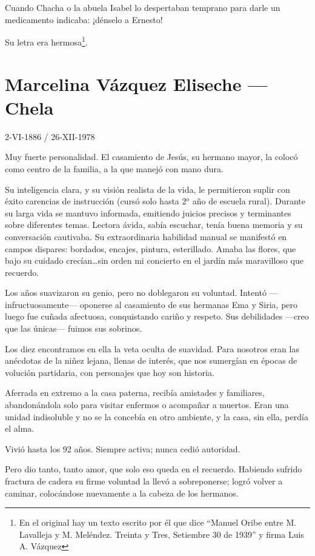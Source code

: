\documentclass[a4paper]{article}
\begin{document}
Cuando Chacha o la abuela Isabel lo despertaban temprano para darle un medicamento indicaba: ¡dénselo a Ernesto!

Su letra era hermosa\footnote{En el original hay un texto escrito por él que dice ``Manuel Oribe entre M. Lavalleja y M. Meléndez. Treinta y Tres, Setiembre 30 de 1939'' y firma Luis A. Vázquez}.

\section{Marcelina Vázquez Eliseche --- Chela}

2-VI-1886 / 26-XII-1978

\bigbreak{}

Muy fuerte personalidad. El casamiento de Jesús, su hermano mayor, la colocó como centro de la familia, a la que manejó con mano dura.

Su inteligencia clara, y su visión realista de la vida, le permitieron suplir con éxito carencias de instrucción (cursó solo hasta 2$^o$ año de escuela rural). Durante su larga vida se mantuvo informada, emitiendo juicios precisos y terminantes sobre diferentes temas. Lectora ávida, sabía escuchar, tenía buena memoria y su conversación cautivaba. Su extraordinaria habilidad manual se manifestó en campos dispares: bordados, encajes, pintura, esterillado. Amaba las flores, que bajo su cuidado crecían\ldots sin orden mi concierto en el jardín más maravilloso que recuerdo.

Los años suavizaron su genio, pero no doblegaron su voluntad. Intentó ---infructuosamente--- oponerse al casamiento de sus hermanas Ema y Siria, pero luego fue cuñada afectuosa, conquistando cariño y respeto. Sus debilidades ---creo que las únicas--- fuimos sus sobrinos.

Los diez encontramos en ella la veta oculta de suavidad. Para nosotros eran las anécdotas de la niñez lejana, llenas de interés, que nos sumergían en épocas de volución partidaria, con personajes que hoy son historia.

Aferrada en extremo a la casa paterna, recibía amistades y familiares, abandonándola solo para visitar enfermos o acompañar a muertos. Eran una unidad indisoluble y no se la concebía en otro ambiente, y la casa, sin ella, perdía el alma.

Vivió hasta los 92 años. Siempre activa; nunca cedió autoridad.

Pero dio tanto, tanto amor, que solo eso queda en el recuerdo. Habiendo sufrido fractura de cadera su firme voluntad la llevó a sobreponerse; logró volver a caminar, colocándose nuevamente a la cabeza de los hermanos.
\end{document}
